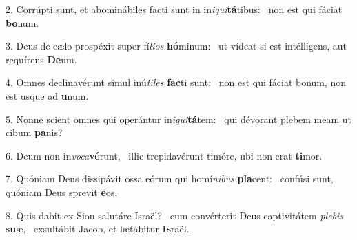 2. Corrúpti sunt, et abominábiles facti sunt in in\textit{i}\textit{qui}\textbf{tá}tibus: \ast\  non est qui fáciat \textbf{bo}num.\

3. Deus de cælo prospéxit super fí\textit{li}\textit{os} \textbf{hó}minum: \ast\  ut vídeat si est intélligens, aut requírens \textbf{De}um.\

4. Omnes declinavérunt simul inú\textit{ti}\textit{les} \textbf{fac}ti sunt: \ast\  non est qui fáciat bonum, non est usque ad \textbf{u}num.\

5. Nonne scient omnes qui operántur in\textit{i}\textit{qui}\textbf{tá}tem: \ast\  qui dévorant plebem meam ut cibum \textbf{pa}nis?\

6. Deum non in\textit{vo}\textit{ca}\textbf{vé}runt, \ast\  illic trepidavérunt timóre, ubi non erat \textbf{ti}mor.\

7. Quóniam Deus dissipávit ossa eórum qui homí\textit{ni}\textit{bus} \textbf{pla}cent: \ast\  confúsi sunt, quóniam Deus sprevit \textbf{e}os.\

8. Quis dabit ex Sion salutáre Israël? \dag\  cum convérterit Deus captivitátem \textit{ple}\textit{bis} \textbf{su}æ, \ast\  exsultábit Jacob, et lætábitur \textbf{Is}raël.\

